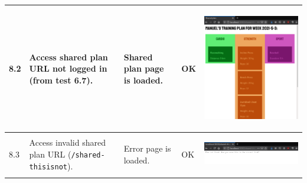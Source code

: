 \documentclass[12pt,twoside,titlepage,a4paper]{article}
\theoremstyle{definicion}
\theoremstyle{lema}
\theoremstyle{teorema}
\theoremstyle{corolario}
\theoremstyle{ejemplo}
\theoremstyle{nota}
\begin{document}
\begin{table}[!h]
\begin{tabular}{|m{0.6cm}|m{2.9cm}|m{3.6cm}|m{1.1cm}|m{5.9cm}|}
		\hline
		8.2 & Access shared plan URL not logged in (from test 6.7). & Shared plan page is loaded. & OK & 
		\begin{center}\includegraphics[scale=0.18]{shared1.png}\end{center} \\
		\hline
		8.3 & Access invalid shared plan URL (\texttt{/shared-} \texttt{thisisnot}). & Error page is loaded. & OK & 
		\begin{center}\includegraphics[scale=0.22]{shared2.png}\end{center} \\
		\hline
	\end{tabular}
\end{table}
\newpage
\end{document}
